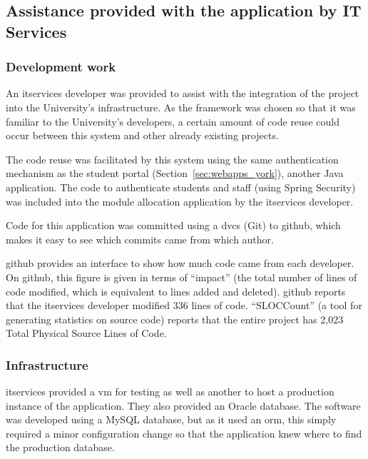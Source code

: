 
\subsection{Assistance provided with the application by IT Services}

\subsubsection{Development work}

An \gls{itservices} developer was provided to assist with the integration of
the project into the University's infrastructure. As the framework was chosen
so that it was familiar to the University's developers, a certain amount of
code reuse could occur between this system and other already existing
projects.

The code reuse was facilitated by this system using the same authentication
mechanism as the student portal (Section~\ref{sec:webapps_york}), another Java
application. The code to authenticate students and staff (using Spring
Security) was included into the module allocation application by the
\gls{itservices} developer.

Code for this application was committed using a \gls{dvcs} (Git) to \gls{github},
which makes it easy to see which commits came from which author.

\gls{github} provides an interface to show how much code came from each
developer. On \gls{github}, this figure is given in terms of ``impact'' (the
total number of lines of code modified, which is equivalent to lines added and
deleted). \gls{github} reports that the \gls{itservices} developer modified
336 lines of code. \mbox{``SLOCCount''} \cite{SLOCCount} (a tool for
generating statistics on source code) reports that the entire project has
2,023 Total Physical Source Lines of Code.

\subsubsection{Infrastructure}

\gls{itservices} provided a \gls{vm} for testing as well as another to host a
production instance of the application. They also provided an Oracle database.
The software was developed using a MySQL database, but as it used an
\gls{orm}, this simply required a minor configuration change so that the
application knew where to find the production database.

